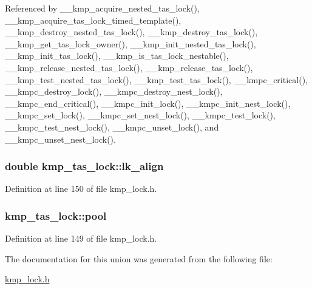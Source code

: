 Referenced by \-\_\-\-\_\-kmp\-\_\-acquire\-\_\-nested\-\_\-tas\-\_\-lock(), \-\_\-\-\_\-kmp\-\_\-acquire\-\_\-tas\-\_\-lock\-\_\-timed\-\_\-template(), \-\_\-\-\_\-kmp\-\_\-destroy\-\_\-nested\-\_\-tas\-\_\-lock(), \-\_\-\-\_\-kmp\-\_\-destroy\-\_\-tas\-\_\-lock(), \-\_\-\-\_\-kmp\-\_\-get\-\_\-tas\-\_\-lock\-\_\-owner(), \-\_\-\-\_\-kmp\-\_\-init\-\_\-nested\-\_\-tas\-\_\-lock(), \-\_\-\-\_\-kmp\-\_\-init\-\_\-tas\-\_\-lock(), \-\_\-\-\_\-kmp\-\_\-is\-\_\-tas\-\_\-lock\-\_\-nestable(), \-\_\-\-\_\-kmp\-\_\-release\-\_\-nested\-\_\-tas\-\_\-lock(), \-\_\-\-\_\-kmp\-\_\-release\-\_\-tas\-\_\-lock(), \-\_\-\-\_\-kmp\-\_\-test\-\_\-nested\-\_\-tas\-\_\-lock(), \-\_\-\-\_\-kmp\-\_\-test\-\_\-tas\-\_\-lock(), \-\_\-\-\_\-kmpc\-\_\-critical(), \-\_\-\-\_\-kmpc\-\_\-destroy\-\_\-lock(), \-\_\-\-\_\-kmpc\-\_\-destroy\-\_\-nest\-\_\-lock(), \-\_\-\-\_\-kmpc\-\_\-end\-\_\-critical(), \-\_\-\-\_\-kmpc\-\_\-init\-\_\-lock(), \-\_\-\-\_\-kmpc\-\_\-init\-\_\-nest\-\_\-lock(), \-\_\-\-\_\-kmpc\-\_\-set\-\_\-lock(), \-\_\-\-\_\-kmpc\-\_\-set\-\_\-nest\-\_\-lock(), \-\_\-\-\_\-kmpc\-\_\-test\-\_\-lock(), \-\_\-\-\_\-kmpc\-\_\-test\-\_\-nest\-\_\-lock(), \-\_\-\-\_\-kmpc\-\_\-unset\-\_\-lock(), and \-\_\-\-\_\-kmpc\-\_\-unset\-\_\-nest\-\_\-lock().

\hypertarget{unionkmp__tas__lock_af85f01205b1098bb84f3dce7b038559b}{
\subsubsection[{lk\-\_\-align}]{\setlength{\rightskip}{0pt plus 5cm}double kmp\-\_\-tas\-\_\-lock\-::lk\-\_\-align}}\label{unionkmp__tas__lock_af85f01205b1098bb84f3dce7b038559b}


Definition at line 150 of file kmp\-\_\-lock.\-h.

\hypertarget{unionkmp__tas__lock_aada78443b49259e3da7eb792931a7d27}{
\subsubsection[{pool}]{ kmp\-\_\-tas\-\_\-lock\-::pool}}\label{unionkmp__tas__lock_aada78443b49259e3da7eb792931a7d27}


Definition at line 149 of file kmp\-\_\-lock.\-h.



The documentation for this union was generated from the following file\-:\begin{DoxyCompactItemize}
\item 
\hyperlink{kmp__lock_8h}{kmp\-\_\-lock.\-h}\end{DoxyCompactItemize}
